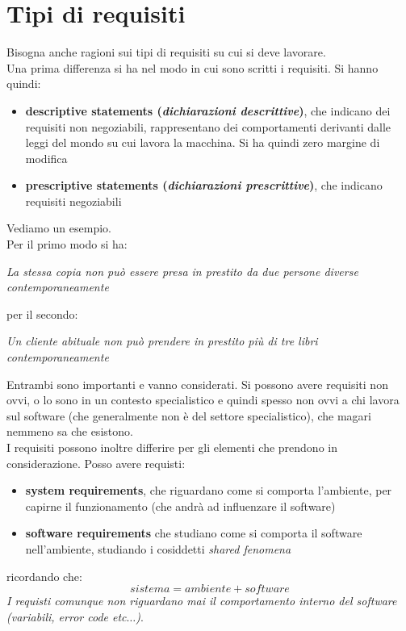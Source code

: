 \documentclass[a4paper,12pt, oneside]{book}
\begin{document}
\section{Tipi di requisiti}
Bisogna anche ragioni sui tipi di requisiti su cui si deve lavorare.\\
Una prima differenza si ha nel modo in cui sono scritti i requisiti. Si hanno
quindi:
\begin{itemize}
  \item \textbf{descriptive statements (\textit{dichiarazioni descrittive})},
  che indicano dei requisiti non negoziabili, rappresentano dei comportamenti
  derivanti dalle leggi del mondo su cui lavora la macchina. Si ha quindi zero
  margine di modifica
  \item \textbf{prescriptive statements (\textit{dichiarazioni prescrittive})},
  che indicano requisiti negoziabili
\end{itemize}
\begin{esempio}
  Vediamo un esempio.\\
  Per il primo modo si ha:
  \begin{center}
    \textit{La stessa copia non può essere presa in prestito da due persone
      diverse contemporaneamente}
  \end{center}
  per il secondo:
  \begin{center}
    \textit{Un cliente abituale non può prendere in prestito più di tre libri
      contemporaneamente}
  \end{center}
\end{esempio}
Entrambi sono importanti e vanno considerati. Si possono avere requisiti non
ovvi, o lo sono in un contesto specialistico e quindi spesso non ovvi a chi
lavora sul software (che generalmente non è del settore specialistico), che
magari nemmeno sa che esistono.\\
I requisiti possono inoltre differire per gli elementi che prendono in
considerazione. Posso avere requisti:
\begin{itemize}
  \item \textbf{system requirements}, che riguardano come si comporta
  l'ambiente, per capirne il funzionamento (che andrà ad influenzare il
  software) 
  \item \textbf{software requirements} che studiano come si comporta il software
  nell'ambiente, studiando i cosiddetti \textit{shared fenomena}
\end{itemize}
ricordando che:
\[sistema = ambiente + software\]
\textit{I requisti comunque non riguardano mai il comportamento interno del
  software (variabili, error code etc$\ldots$)}.\\
\end{document}

